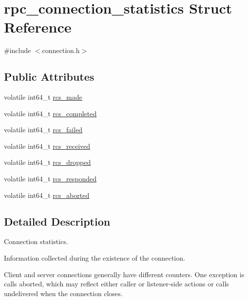 \hypertarget{structrpc__connection__statistics}{}\section{rpc\+\_\+connection\+\_\+statistics Struct Reference}
\label{structrpc__connection__statistics}


{\ttfamily \#include $<$connection.\+h$>$}

\subsection*{Public Attributes}
\begin{DoxyCompactItemize}
\item 
volatile int64\+\_\+t \hyperlink{structrpc__connection__statistics_af103786616d6818d26916fde09f7378b}{rcs\+\_\+made}
\item 
volatile int64\+\_\+t \hyperlink{structrpc__connection__statistics_a0f504295a3ce46a549fd8d64b2bc756d}{rcs\+\_\+completed}
\item 
volatile int64\+\_\+t \hyperlink{structrpc__connection__statistics_af6831aa1e5d7a3873f897e26b513f6f3}{rcs\+\_\+failed}
\item 
volatile int64\+\_\+t \hyperlink{structrpc__connection__statistics_a8041fd880d4d9b01ba6902883ce8e7f1}{rcs\+\_\+received}
\item 
volatile int64\+\_\+t \hyperlink{structrpc__connection__statistics_afb3a42144bcd33b86fbb2f1b1940cbdb}{rcs\+\_\+dropped}
\item 
volatile int64\+\_\+t \hyperlink{structrpc__connection__statistics_a9c9cd982c4e9c548175e11e5a6a19401}{rcs\+\_\+responded}
\item 
volatile int64\+\_\+t \hyperlink{structrpc__connection__statistics_a7f08b926ae481841fb3085b329a37fef}{rcs\+\_\+aborted}
\end{DoxyCompactItemize}


\subsection{Detailed Description}
Connection statistics.

Information collected during the existence of the connection.

Client and server connections generally have different counters. One exception is calls aborted, which may reflect either caller or listener-\/side actions or calls undelivered when the connection closes. 

